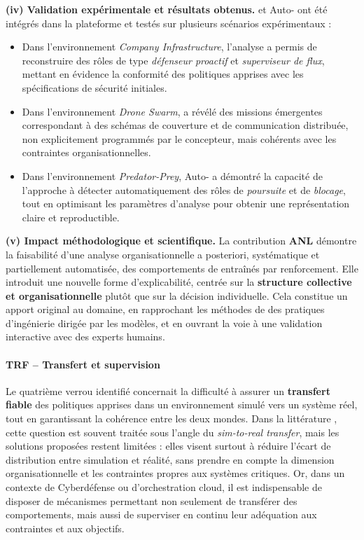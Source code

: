 \medskip
\noindent
\textbf{(iv) Validation expérimentale et résultats obtenus.}
 et Auto- ont été intégrés dans la plateforme  et testés sur plusieurs scénarios expérimentaux :
\begin{itemize}
  \item Dans l'environnement \textit{Company Infrastructure}, l'analyse a permis de reconstruire des rôles de type \textit{défenseur proactif} et \textit{superviseur de flux}, mettant en évidence la conformité des politiques apprises avec les spécifications de sécurité initiales.
  \item Dans l'environnement \textit{Drone Swarm},  a révélé des missions émergentes correspondant à des schémas de couverture et de communication distribuée, non explicitement programmés par le concepteur, mais cohérents avec les contraintes organisationnelles.
  \item Dans l'environnement \textit{Predator-Prey}, Auto- a démontré la capacité de l'approche à détecter automatiquement des rôles de \textit{poursuite} et de \textit{blocage}, tout en optimisant les paramètres d'analyse pour obtenir une représentation claire et reproductible.
\end{itemize}

\medskip
\noindent
\textbf{(v) Impact méthodologique et scientifique.}
La contribution \textbf{ANL} démontre la faisabilité d'une analyse organisationnelle a posteriori, systématique et partiellement automatisée, des comportements de  entraînés par renforcement.
Elle introduit une nouvelle forme d'explicabilité, centrée sur la \textbf{structure collective et organisationnelle} plutôt que sur la décision individuelle.
Cela constitue un apport original au domaine, en rapprochant les méthodes de  des pratiques d'ingénierie dirigée par les modèles, et en ouvrant la voie à une validation interactive avec des experts humains.

\paragraph{TRF – Transfert et supervision}

Le quatrième verrou identifié concernait la difficulté à assurer un \textbf{transfert fiable} des politiques apprises dans un environnement simulé vers un système réel, tout en garantissant la cohérence entre les deux mondes.
Dans la littérature , cette question est souvent traitée sous l'angle du \textit{sim-to-real transfer}, mais les solutions proposées restent limitées :
elles visent surtout à réduire l'écart de distribution entre simulation et réalité, sans prendre en compte la dimension organisationnelle et les contraintes propres aux systèmes critiques.
Or, dans un contexte de Cyberdéfense ou d'orchestration cloud, il est indispensable de disposer de mécanismes permettant non seulement de transférer des comportements, mais aussi de superviser en continu leur adéquation aux contraintes et aux objectifs.


